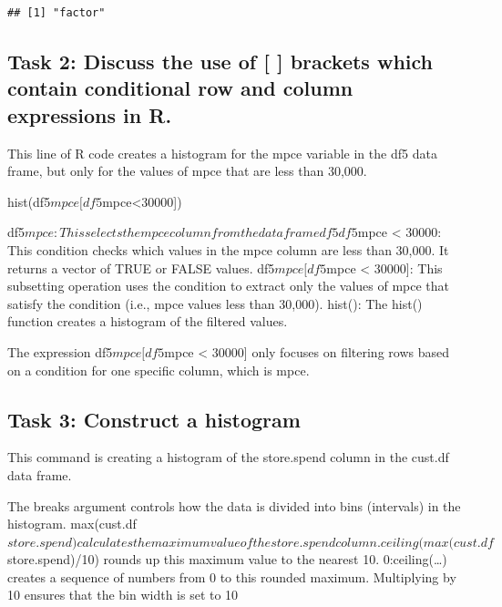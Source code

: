 \documentclass[
]{article}
\newenvironment{Shaded}{\begin{snugshade}}{\end{snugshade}}
\newcommand{\FunctionTok}[1]{\textcolor[rgb]{0.13,0.29,0.53}{\textbf{#1}}}
\newcommand{\NormalTok}[1]{#1}
\newcommand{\SpecialCharTok}[1]{\textcolor[rgb]{0.81,0.36,0.00}{\textbf{#1}}}
\begin{document}
\begin{Shaded}
\end{Shaded}

\begin{verbatim}
## [1] "factor"
\end{verbatim}

\subsection{Task 2: Discuss the use of {[} {]} brackets which contain
conditional row and column expressions in
R.}\label{task-2-discuss-the-use-of-brackets-which-contain-conditional-row-and-column-expressions-in-r.}

This line of R code creates a histogram for the mpce variable in the df5
data frame, but only for the values of mpce that are less than 30,000.

hist(df5\(mpce[df5\)mpce\textless30000{]})

df5\(mpce: This selects the mpce column from the data frame df5
df5\)mpce \textless{} 30000: This condition checks which values in the
mpce column are less than 30,000. It returns a vector of TRUE or FALSE
values. df5\(mpce[df5\)mpce \textless{} 30000{]}: This subsetting
operation uses the condition to extract only the values of mpce that
satisfy the condition (i.e., mpce values less than 30,000). hist(): The
hist() function creates a histogram of the filtered values.

The expression df5\(mpce[df5\)mpce \textless{} 30000{]} only focuses on
filtering rows based on a condition for one specific column, which is
mpce.

\subsection{Task 3: Construct a
histogram}\label{task-3-construct-a-histogram}

This command is creating a histogram of the store.spend column in the
cust.df data frame.

The breaks argument controls how the data is divided into bins
(intervals) in the histogram.
max(cust.df\(store.spend) calculates the maximum value of the store.spend column.
ceiling(max(cust.df\)store.spend)/10) rounds up this maximum value to
the nearest 10. 0:ceiling(\ldots) creates a sequence of numbers from 0
to this rounded maximum. Multiplying by 10 ensures that the bin width is
set to 10
\end{document}
